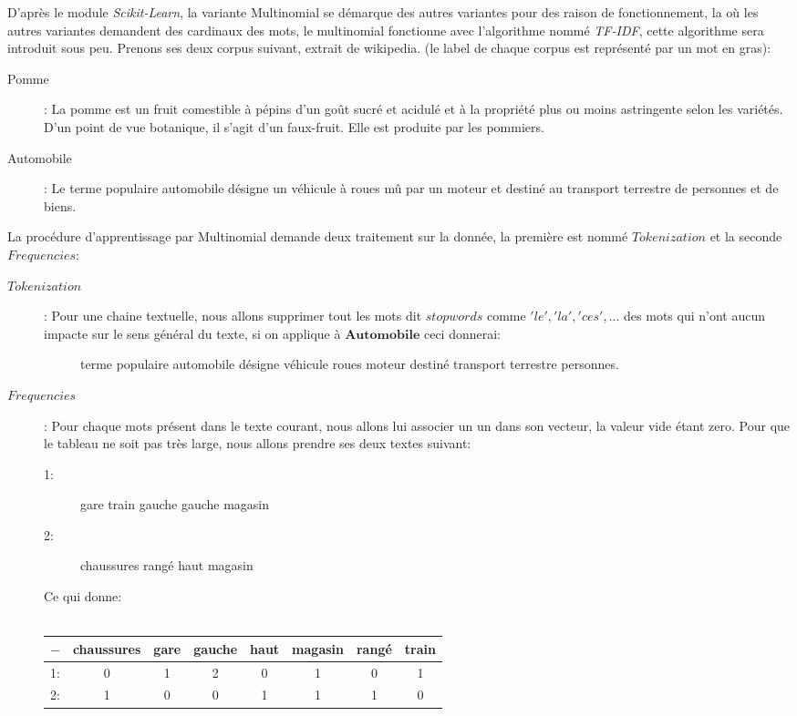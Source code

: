 D'après le module \textit{Scikit-Learn}, la variante Multinomial se démarque des autres variantes pour des raison de fonctionnement, la où les autres variantes demandent des cardinaux des mots, le multinomial fonctionne avec l'algorithme nommé \textit{TF-IDF}, cette algorithme sera introduit sous peu.\linebreak
\linebreak
Prenons ses deux corpus suivant, extrait de wikipedia. (le label de chaque corpus est représenté par un mot en gras):\\
\begin{description}
\item[Pomme]: La pomme est un fruit comestible à pépins d'un goût sucré et acidulé et à la propriété plus ou moins astringente selon les variétés. D'un point de vue botanique, il s'agit d'un faux-fruit. Elle est produite par les pommiers.
\item[Automobile]: Le terme populaire automobile désigne un véhicule à roues mû par un moteur et destiné au transport terrestre de personnes et de biens.
\end{description}

\pagebreak

La procédure d'apprentissage par Multinomial demande deux traitement sur la donnée, la première est nommé $Tokenization$ et la seconde $Frequencies$:\\
\begin{description}
\item[$Tokenization$]: Pour une chaine textuelle, nous allons supprimer tout les mots dit $stopwords$ comme $'le','la','ces',...$ des mots qui n'ont aucun impacte sur le sens général du texte, si on applique à $\textbf{Automobile}$ ceci donnerai: 
\begin{description}
\item[] terme populaire automobile désigne véhicule roues moteur destiné transport terrestre personnes.
\end{description}

\item[$Frequencies$]: Pour chaque mots présent dans le texte courant, nous allons lui associer un un dans son vecteur, la valeur vide étant zero. Pour que le tableau ne soit pas très large, nous allons prendre ses deux textes suivant: 
\begin{description}
\item[1:] gare train gauche gauche magasin
\item[2:] chaussures rangé haut magasin
\end{description}
Ce qui donne:\\\\
\begin{tabular}{c|c|c|c|c|c|c|c}
$-$ & chaussures & gare & gauche & haut & magasin & rangé & train\\
\hline
1: & 0 & 1 & 2 & 0 & 1 & 0 & 1\\
2: & 1 & 0 & 0 & 1 & 1 & 1 & 0\\
\end{tabular}
\end{description}

